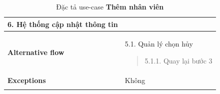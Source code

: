 \begin{longtable}{| p{} | p{} |}
                    6. Hệ thống cập nhật thông tin
                \\
                \hline
                \begin{flushleft}
                    \textbf{Alternative flow}
                \end{flushleft}
                &
                5.1. Quản lý chọn hủy
                    \begin{quote} 
                    5.1.1. Quay lại bước 3
                    \end{quote}
                \\
                \hline
                    \textbf{Exceptions} 
                &
                    Không
                \\
                \hline
                \caption{Đặc tả use-case \textbf{Thêm nhân viên}}
            \end{longtable}
    
